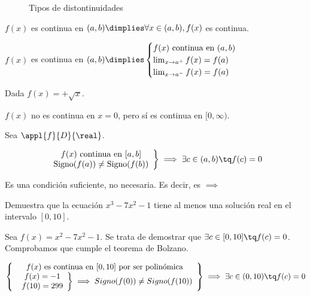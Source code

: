 \begin{figure}
\centering
\label{fig::fun-tipos-discontinuidad}
\caption{Tipos de distontinuidades}
\end{figure}

\begin{defn}
$f(x)$ es continua en $(a,b) \dimplies \forall x\in(a,b), f(x)$ es continua.
\end{defn}

\begin{defn}
$f(x)$ es continua en $(a,b) \dimplies \begin{cases} f(x) \text{ continua en } (a,b)\\
\lim_{x\to a^+}f(x) = f(a)\\
\lim_{x\to a^-}f(x) = f(a)\\
 \end{cases}$
\end{defn}

\begin{example}

Dada $f(x) = +\sqrt{x}$.

$f(x)$ no es continua en $x=0$, pero sí es continua en $[0,\infty)$.

\end{example}

\begin{theorem}
Sea $\appl{f}{D}{\real}$.

\[
\left.\begin{array}{c}f(x) \text{ continua en } [a,b]\\\text{Signo}(f(a))\neq \text{Signo}(f(b))\end{array}\right\}\implies \exists c\in(a,b) \tq f(c) = 0
\]

\obs Es una condición suficiente, no necesaria. Es decir, es $\implies $
\end{theorem}

\begin{problem} Demuestra que la ecuación $x^3-7x^2-1$ tiene al menos una solución real en el intervalo $[0,10]$.
\solution

Sea $f(x) = x^2-7x^2-1$. Se trata de demostrar que $\exists c\in[0,10]\tq f(c) = 0$. Comprobamos que cumple el teorema de Bolzano.

\[
\left\{
	\begin{array}{c}
		f(x) \text{ es continua en } [0,10] \text{ por ser polinómica}\\
		\left.\begin{array}{c}
		f(x) = -1 \\
		f(10) = 299\end{array}
		\right\}\implies Signo(f(0))\neq Signo(f(10))
	\end{array}
\right\}\implies \exists c\in(0,10)\tq f(c)=0 
\]
\end{problem}

